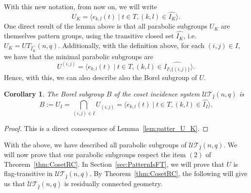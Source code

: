 \documentclass[11pt,letterpaper]{amsart}
\newtheorem{coro}[theorem]{Corollary}
\newcommand{\TT}{\mathcal{T}}
\newcommand{\UU}{\mathcal{U}}
\begin{document}
 With this new notation, from now on, we will write $$U_{K} =  \langle e_{k,l}(t)\mid t\in T, (k,l)\in \widehat{I_{K}}\rangle.$$
One direct result of the lemma above is that all parabolic subgroups $U_K$ are themselves pattern groups, using the transitive closed set $\widehat{I_K}$, i.e. $U_K = UT_{\widehat{I_K}}(n,q)$.
Additionally, with the definition above, for each $(i,j)\in I$, we have that the minimal parabolic subgroups are $$U^{(i,j)}=\langle e_{k,l}(t)\mid t\in T, (k,l)\in \widehat{I_{I\setminus\{(i,j)\}}}\rangle.$$
Hence, with this, we can also describe also the Borel subgroup of $U$.

\begin{coro}\label{coro:Pattern_Borel}
The Borel subgroup $B$ of the coset incidence system $\UU\TT_{\widehat{I}}(n,q)$ is
    $$B := U_I= \bigcap_{(i,j)\in I} U_{(i,j)} = \langle e_{k,l}(t)\mid t\in T, (k,l)\in \widehat{I_I}\rangle.$$
\end{coro}
\begin{proof}
    This is a direct consequence of Lemma~\ref{lem:patter_U_K}.
\end{proof}

With the above, we have described all parabolic subgroups of $\UU\TT_{\widehat{I}}(n,q)$.
We will now prove that our parabolic subgroups respect the item $(2)$ of Theorem~\ref{thm:CosetRC}. In Section~\ref{sec:PatternIsFT}, we will prove that $U$ is flag-transitive in $\UU\TT_{\widehat{I}}(n,q)$. By Theorem~\ref{thm:CosetRC}, the following will give us that $\UU\TT_{\widehat{I}}(n,q)$ is residually connected geometry. 
\end{document}
